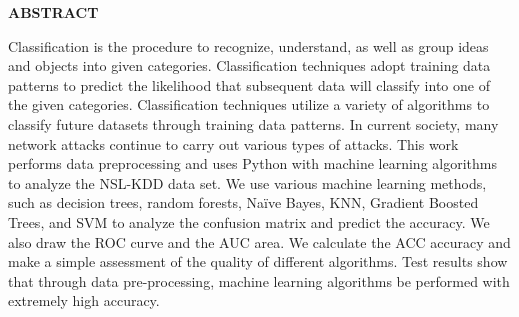 \thispagestyle{plain}
\begin{center}
    \Large \textbf{\uppercase{Abstract}}
\end{center}

\vspace{1\baselineskip}

\noindent
Classification is the procedure to recognize, understand, as well as group ideas and objects into
given categories. Classification techniques adopt training data patterns to predict the likelihood
that subsequent data will classify into one of the given categories. Classification techniques
utilize a variety of algorithms to classify future datasets through training data patterns. In
current society, many network attacks continue to carry out various types of attacks. This work
performs data preprocessing and uses Python with machine learning algorithms to analyze the
NSL-KDD data set. We use various machine learning methods, such as decision trees, random
forests, Naïve Bayes, KNN, Gradient Boosted Trees, and SVM to analyze the confusion matrix
and predict the accuracy. We also draw the ROC curve and the AUC area. We calculate the
ACC accuracy and make a simple assessment of the quality of different algorithms. Test results
show that through data pre-processing, machine learning algorithms be performed with
extremely high accuracy.